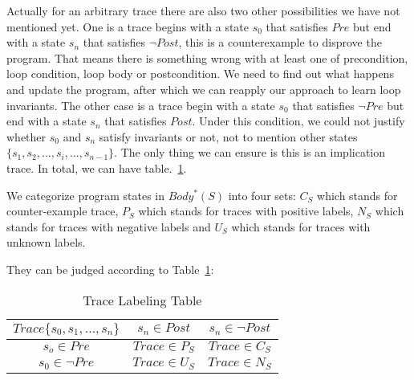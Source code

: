 Actually for an arbitrary trace there are also two other possibilities we have not mentioned yet.
One is a trace begins with a state $s_0$ that satisfies $Pre$ but end with a state $s_n$ that satisfies $\neg Post$,
this is a counterexample to disprove the program.
That means there is something wrong with at least one of precondition, loop condition, loop body or postcondition.
We need to find out what happens and update the program, 
after which we can reapply our approach to learn loop invariants.
The other case is a trace begin with a state $s_0$ that satisfies $\neg Pre$ but end with a state $s_n$ that satisfies $Post$.
Under this condition, we could not justify whether $s_0$ and $s_n$ satisfy invariants or not,
not to mention other states $\{s_1, s_2, ..., s_i, ... , s_{n-1}\}$.
The only thing we can ensure is this is an implication trace.
In total, we can have table.~\ref{LabelingTable}.


We categorize program states in $Body^*(S)$ into four sets:
$C_{S}$ which stands for counter-example trace, 
$P_{S}$ which stands for traces with positive labels, 
$N_{S}$ which stands for traces with negative labels 
and $U_{S}$ which stands for traces with unknown labels.



They can be judged according to Table~\ref{LabelingTable}: 

\begin{table}[htb]
\label{LabelingTable}
\centering
\caption{Trace Labeling Table}
\begin{tabular}[float]{|c|c|c|}
\hline
$Trace\{s_0, s_1, ..., s_n\}$         & $s_n \in Post$                     & $s_n \in \neg Post$\\
\hline
$s_o \in Pre$                 & $Trace \in P_{S}$                & $Trace \in C_{S}$\\
\hline
$s_0 \in \neg Pre$            & $Trace \in U_{S}$         & $Trace \in N_{S}$\\
\hline
\end{tabular}
\end{table}


